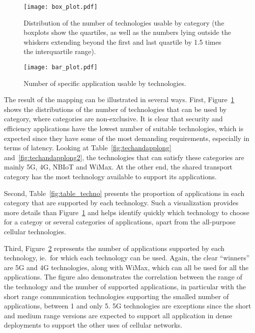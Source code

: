 
\begin{figure}[ht!]
  \begin{center}
    \texttt{[image: box\_plot.pdf]}
    \caption{Distribution of the number of technologies usable by category (the boxplots show the quartiles, as well as the numbers lying outside the whiskers extending beyond the first and last quartile by 1.5 times the interquartile range).}
    \label{fig:boxplot}
  \end{center}
\end{figure}

\begin{figure}[ht!]
  \begin{center}
    \texttt{[image: bar\_plot.pdf]}
    \caption{Number of specific application usable by technologies.}
    \label{fig:barplot}
  \end{center}
\end{figure}

The result of the mapping can be illustrated in several ways. First, Figure~\ref{fig:boxplot} shows the distributions of the number of technologies that can be used by category, where categories are non-exclusive. It is clear that security and efficiency applications have the lowest number of suitable technologies, which is expected since they have some of the most demanding requirements, especially in terms of latency. Looking at Table~\ref{fig:techandapplong} and~\ref{fig:techandapplong2}, the technologies that can satisfy these categories are mainly 5G, 4G, NBIoT and WiMax. At the other end, the shared transport category has the most technology available to support its applications.

Second, Table~\ref{fig:table_techno} presents the proportion of applications in each category that are supported by each technology. Such a visualization provides more details than Figure~\ref{fig:boxplot} and helps identify quickly which technology to choose for a categoy or several categories of applications, apart from the all-purpose cellular technologies. 

Third, Figure~\ref{fig:barplot} represents the number of applications supported by each technology, ie.\ for which each technology can be used. Again, the clear ``winners'' are 5G and 4G technologies, along with WiMax, which can all be used for all the applications. 
The figure also demonstrates the correlation between the range of the technology and the number of supported applications, in particular with the short range communication technologies supporting the smalled number of applications, between 1 and only 5. 5G technologies are exceptions since the short and medium range versions are expected to support all application in dense deployments to support the other uses of cellular networks. 

